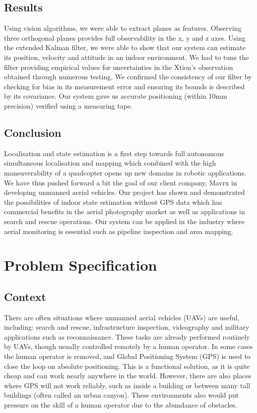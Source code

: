 \documentclass[]{article}
\begin{document}
{\subsection{Results}
Using vision algorithms, we were able to extract planes as features. Observing three orthogonal planes provides full observability in the x, y and z axes. Using the extended Kalman filter, we were able to show that our system can estimate its position, velocity and attitude in an indoor environment. We had to tune the filter providing empirical values for uncertainties in the Xtion's observation obtained through numerous testing. We confirmed the consistency of our filter by checking for bias in its measurement error and ensuring its bounds is described by its covariance. Our system gave us accurate positioning (within 10mm precision) verified using a measuring tape. 

\subsection{Conclusion}
Localisation and state estimation is a first step towards full autonomous simultaneous localisation and mapping which combined with the high maneuverability of a quadcopter opens up new domains in robotic applications. We have thus pushed forward a bit the goal of our client company, Mavrx in developing unmanned aerial vehicles. Our project has shown and demonstrated the possibilities of indoor state estimation without GPS data which has commercial benefits in the aerial photography market as well as applications in search and rescue operations. Our system can be applied in the industry where aerial monitoring is essential such as pipeline inspection and area mapping.  


\clearpage


\section{Problem Specification}
\label{sec:problem_specification}

\subsection{Context} %
\label{sub:context}

There are often situations where unmanned aerial vehicles (UAVs) are useful, including: search and rescue, infrastructure inspection, videography and military applications such as reconnaissance. These tasks are already performed routinely by UAVs, though usually controlled remotely by a human operator. In some cases the human operator is removed, and Global Positioning System (GPS) is used to close the loop on absolute positioning. This is a functional solution, as it is quite cheap and can work nearly anywhere in the world. However, there are also places where GPS will not work reliably, such as inside a building or between many tall buildings (often called an urban canyon). These environments also would put pressure on the skill of a human operator due to the abundance of obstacles.

}
\end{document}
